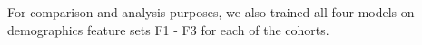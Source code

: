 For comparison and analysis purposes, we also trained all four models on demographics feature sets F1 - F3
for each of the cohorts. 
